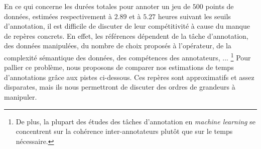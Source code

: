			
			
			En ce qui concerne les durées totales pour annoter un jeu de $500$ points de données, estimées respectivement à $2.89$ et à $5.27$ heures suivant les seuils d'annotation, il est difficile de discuter de leur compétitivité à cause du manque de repères concrets.
			En effet, les références dépendent de la tâche d'annotation, des données manipulées, du nombre de choix proposés à l'opérateur, de la complexité sémantique des données, des compétences des annotateurs, ...
			\footnote{De plus, la plupart des études des tâches d'annotation en \textit{machine learning} se concentrent sur la cohérence inter-annotateurs plutôt que sur le temps nécessaire.}
			Pour pallier ce problème, nous proposons de comparer nos estimations de temps d'annotations grâce aux pistes ci-dessous.
			Ces repères sont approximatifs et assez disparates, mais ils nous permettront de discuter des ordres de grandeurs à manipuler.
			
